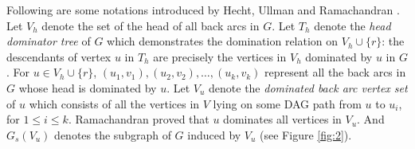 \documentclass[11pt]{article}
\begin{document}
Following are some notations introduced by Hecht, Ullman \cite{HecU1, HecU2} and Ramachandran \cite{Rama1,Rama2}. Let $V_h$ denote the set of the head of all back arcs in $G$. Let $T_h$ denote the \emph{head dominator tree} of $G$ which demonstrates the domination relation on $V_h\cup \{r\}$: the descendants of vertex $u$ in $T_h$ are precisely the vertices in $V_h$ dominated by $u$ in $G$. For $u\in V_h\cup\{r\}$, $(u_1,v_1),(u_2,v_2),\ldots,(u_k,v_k)$ represent all the back arcs in $G$ whose head is dominated by $u$. Let $V_u$ denote the \emph{dominated back arc vertex set} of $u$ which consists of all the vertices in $V$ lying on some DAG path from $u$ to $u_i$, for $1\leq i\leq k$. Ramachandran \cite{Rama1,Rama2} proved that $u$ dominates all vertices in $V_u$. And $G_s(V_u)$ denotes the subgraph of $G$ induced by $V_u$ (see Figure \ref{fig:2}).
\end{document}
